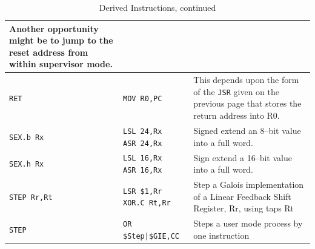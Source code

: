 \documentclass{gqtekspec}
\begin{document}
\begin{table}
\begin{center}
\begin{tabular}{p{1.2in}p{1.5in}p{3.2in}}
	Another opportunity might be to jump to the reset address from within
	supervisor mode.\\\hline
{\tt RET} & {\tt MOV R0,PC}
	& This depends upon the form of the {\tt JSR} given on the previous
	page that stores the return address into R0.
	\\\hline
{\tt SEX.b Rx }
	& \parbox[t]{1.5in}{\tt LSL 24,Rx \\ ASR 24,Rx}
	& Signed extend an 8--bit value into a full word.\\\hline
{\tt SEX.h Rx }	
	& \parbox[t]{1.5in}{\tt LSL 16,Rx \\ ASR 16,Rx}
	& Sign extend a 16--bit value into a full word.\\\hline
{\tt STEP Rr,Rt}
	& \parbox[t]{1.5in}{\tt LSR \$1,Rr \\ XOR.C Rt,Rr}
	& Step a Galois implementation of a Linear Feedback Shift Register, Rr,
		using taps Rt \\\hline
{\tt STEP}
	& \parbox[t]{1.5in}{\tt OR \$Step|\$GIE,CC}
	& Steps a user mode process by one instruction\\\hline
%
%
\end{tabular}
\caption{Derived Instructions, continued}\label{tbl:derived-3}
\end{center}\end{table}
\end{document}
